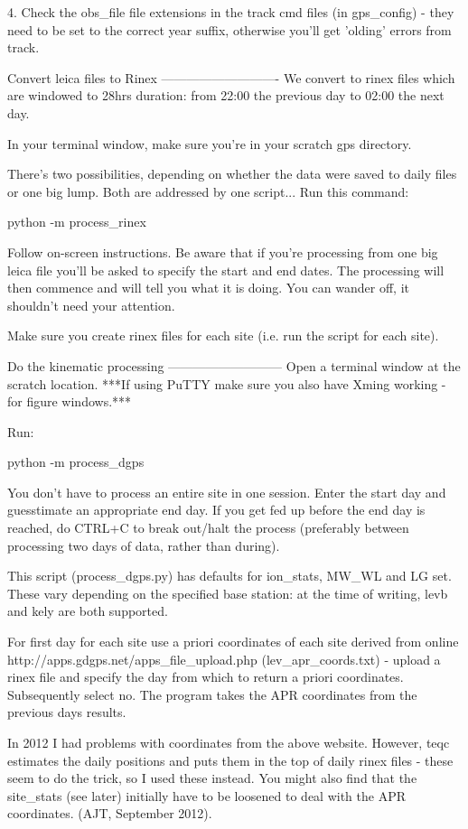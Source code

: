 \documentclass[11pt]{article} %
\begin{document}
4. Check the obs_file file extensions in the track cmd files (in gps_config) - they need to be set to the correct year suffix, otherwise you'll get 'olding' errors from track.
		
	
	
Convert leica files to Rinex
----------------------------
We convert to rinex files which are windowed to 28hrs duration: from 22:00 the previous day to 02:00 the next day.

In your terminal window, make sure you're in your scratch gps directory.

There's two possibilities, depending on whether the data were saved to daily files or one big lump.
Both are addressed by one script...
Run this command:

	python -m process_rinex
	
Follow on-screen instructions. Be aware that if you're processing from one big leica file you'll be asked to specify the start and end dates. The processing will then commence and will tell you what it is doing. You can wander off, it shouldn't need your attention.

Make sure you create rinex files for each site (i.e. run the script for each site).



Do the kinematic processing
---------------------------
Open a terminal window at the scratch location. 
***If using PuTTY make sure you also have Xming working - for figure windows.***

Run:
	
	python -m process_dgps
	
You don't have to process an entire site in one session. Enter the start day and guesstimate an appropriate end day. If you get fed up before the end day is reached, do CTRL+C to break out/halt the process (preferably between processing two days of data, rather than during).

This script (process_dgps.py) has defaults for ion_stats, MW_WL and LG set. These vary depending on the specified base station: at the time of writing, levb and kely are both supported.

For first day for each site use a priori coordinates of each site derived from online 
 http://apps.gdgps.net/apps_file_upload.php (lev_apr_coords.txt)
 - upload a rinex file and specify the day from which to return a priori coordinates.
Subsequently select no. The program takes the APR coordinates from the previous days results.

In 2012 I had problems with coordinates from the above website. However, teqc estimates the daily positions and puts them in the top of daily rinex files - these seem to do the trick, so I used these instead. You might also find that the site_stats (see later) initially have to be loosened to deal with the APR coordinates. (AJT, September 2012).
\end{document}
